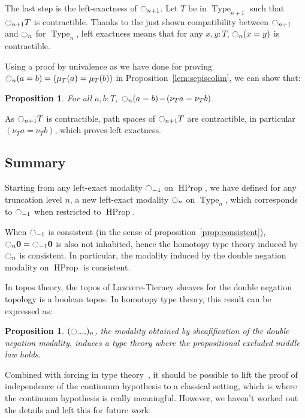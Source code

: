 \documentclass[preprint,9pt,numbers]{sigplanconf}
\newtheorem{prop}[thm]{Proposition}
\DeclareMathOperator{\Type}{Type}
\DeclareMathOperator{\HProp}{HProp}
\newcommand{\modal}{\ensuremath{\ocircle}}
\newcommand \zero {\mathbf{0}}
\begin{document}
The last step is the left-exactness of $\modal_{n+1}$. Let $T$ be in
$\Type_{n+1}$ such that $\modal_{n+1} T$ is contractible.  Thanks to the just
shown compatibility between $\modal_{n+1}$ and $\modal_n$ for
$\Type_n$, left exactness means that for any $x,y: T$,
$\modal_n(x=y)$ is contractible.

Using a proof by univalence as we have done for proving $\modal_n (a=b) = (\mu_T(a) =
\mu_T (b))$ in Proposition~\ref{lem:sepiscolim}, we can show that:
\begin{prop}
  For all $a,b:T$, $\modal_n(a=b) \!=\! (\nu_T a = \nu_T b)$.
\end{prop}

As $\modal_{n+1} T$ is contractible, path spaces of $\modal_{n+1} T$ are
contractible, in particular $(\nu_T a=\nu_T b)$, which proves left
exactness.

\subsection{Summary}
\label{ssec:summary}

Starting from any left-exact modality $\modal_{-1}$ on $\HProp$, we
have defined for any truncation level $n$, a new left-exact modality
$\modal_n$ on $\Type_n$, which corresponds to $\modal_{-1}$ when
restricted to $\HProp$.


When $\modal_{-1}$ is consistent (in the sense of
proposition~\ref{prop:consistent}), 
$\modal_{n}\zero=\modal_{-1}\zero$ is also not inhabited, hence the homotopy type theory induced by
$\modal_n$ is consistent. 
%
In particular, the modality induced by the double negation modality on
$\HProp$ is consistent.

In topos theory, the topos of Lawvere-Tierney sheaves for the double
negation topology is a boolean topos. In homotopy type theory, this
result can be expressed as:

\begin{prop}
  $(\modal_{\lnot\lnot})_n$, the modality obtained by sheafifica\-tion
  of the double negation modality,
  induces a type theory where the propositional excluded middle law holds.
\end{prop}

Combined with forcing in type theory~\cite{jaber2012extending}, it
should be possible to lift the proof of independence of the continuum
hypothesis to a classical setting, which is where the continuum hypothesis is
really meaningful.  However, we haven't worked out the details and left
this for future work.
\end{document}
